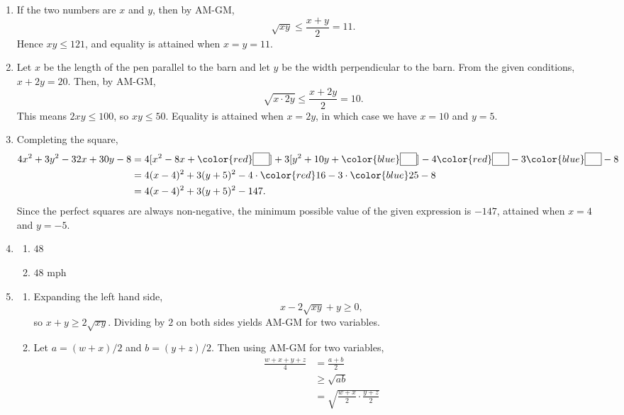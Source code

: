 \begin{enumerate}
\item If the two numbers are $x$ and $y$, then by AM-GM,
\begin{equation*}
\sqrt{xy}\leq\frac{x + y}{2} = 11.
\end{equation*}
Hence $xy\leq\boxed{121}$, and equality is attained when $x = y = 11$.
\item Let $x$ be the length of the pen parallel to the barn and let $y$ be the width perpendicular to the barn. From the given conditions, $x + 2y = 20$. Then, by AM-GM,
\begin{equation*}
\sqrt{x\cdot 2y}\leq\frac{x + 2y}{2} = 10.
\end{equation*}
This means $2xy\leq 100$, so $xy\leq\boxed{50}$. Equality is attained when $x = 2y$, in which case we have $x = 10$ and $y = 5$.
\item Completing the square,
\begin{align*} 
4x^2 + 3y^2 - 32x + 30y - 8 &= 4[x^2 - 8x + {\color{red}\boxed{\phantom{16}}}] + 3[y^2 + 10y + {\color{blue}\boxed{\phantom{25}}}] - 4{\color{red}\boxed{\phantom{16}}} - 3{\color{blue}\boxed{\phantom{25}}} - 8 \\
&= 4(x - 4)^2 + 3(y + 5)^2 - 4\cdot {\color{red}16} - 3\cdot {\color{blue}25} - 8 \\
&= 4(x - 4)^2 + 3(y + 5)^2 - 147.
\end{align*}
Since the perfect squares are always non-negative, the minimum possible value of the given expression is $\boxed{-147}$, attained when $x = 4$ and $y = -5$.
\item \begin{enumerate} 
\item $48$
\item $48$ mph
\end{enumerate}
\item \begin{enumerate}
\item Expanding the left hand side,
\begin{equation*}
x - 2\sqrt{xy} + y\geq 0,
\end{equation*}
so $x + y\geq 2\sqrt{xy}$. Dividing by $2$ on both sides yields AM-GM for two variables.
\item Let $a = (w + x)/2$ and $b = (y + z)/2$. Then using AM-GM for two variables,
\begin{align*}
\frac{w + x + y + z}{4} &= \frac{a + b}{2} \\
&\geq\sqrt{ab} \\
&=\sqrt{\frac{w + x}{2}\cdot\frac{y + z}{2}} \\

\end{align*}
\end{enumerate}
\end{enumerate}
